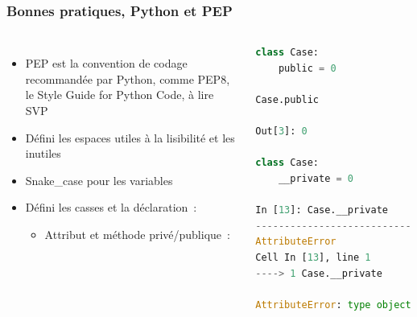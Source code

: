 \documentclass{beamer}
\begin{document}
    \begin{frame}[fragile]
        \transdissolve
        \frametitle{Bonnes pratiques, Python et PEP}
        \begin{columns}
            \begin{itemize}
                \item PEP est la convention de codage recommandée par Python, comme PEP8, le Style Guide for Python Code, à lire SVP
                \item Défini les espaces utiles à la lisibilité et les inutiles
                \item Snake\_case pour les variables
                \item Défini les casses et la déclaration~:
                \begin{itemize}
                    \item Attribut et méthode privé/publique~:
                \end{itemize}
            \end{itemize}
            \begin{lstlisting}[language=python]
class Case:
    public = 0

Case.public

Out[3]: 0

class Case:
    __private = 0

In [13]: Case.__private
---------------------------------------------------------------------------
AttributeError                            Traceback (most recent call last)
Cell In [13], line 1
----> 1 Case.__private

AttributeError: type object 'Case' has no attribute '__private'
            \end{lstlisting}
        \end{columns}
    \end{frame}
\end{document}
